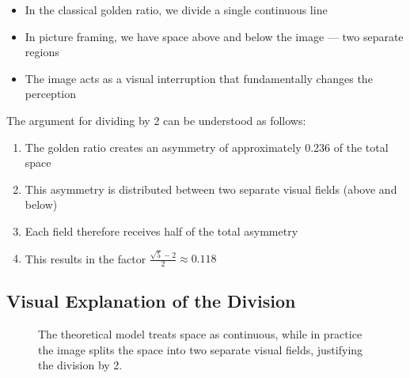 \documentclass[12pt,a4paper]{article}
\begin{document}
\begin{itemize}
    \item In the classical golden ratio, we divide a single continuous line
    \item In picture framing, we have space above and below the image --- two separate regions
    \item The image acts as a visual interruption that fundamentally changes the perception
\end{itemize}

The argument for dividing by 2 can be understood as follows:

\begin{enumerate}
    \item The golden ratio creates an asymmetry of approximately 0.236 of the total space
    \item This asymmetry is distributed between two separate visual fields (above and below)
    \item Each field therefore receives half of the total asymmetry
    \item This results in the factor $\frac{\sqrt{5} - 2}{2} \approx 0.118$
\end{enumerate}

\subsection{Visual Explanation of the Division}

\begin{figure}[h!]
\centering
{}
\caption{The theoretical model treats space as continuous, while in practice the image splits the space into two separate visual fields, justifying the division by 2.}
\end{figure}
\end{document}
